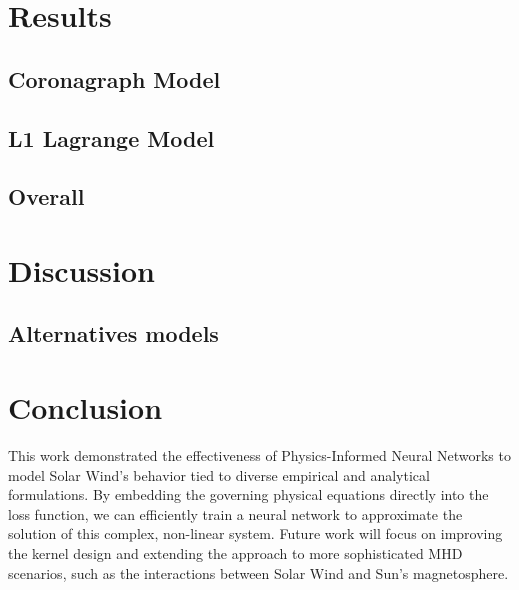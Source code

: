 \documentclass[12pt]{article}
\begin{document}
\section{Results}

\subsection{Coronagraph Model}

\subsection{L1 Lagrange Model}

\subsection{Overall}

\section{Discussion}

\subsection{Alternatives models}

\section{Conclusion}
This work demonstrated the effectiveness of Physics-Informed Neural Networks to model Solar Wind's behavior tied to diverse empirical and analytical formulations. By embedding the governing physical equations directly into the loss function, we can efficiently train a neural network to approximate the solution of this complex, non-linear system. Future work will focus on improving the kernel design and extending the approach to more sophisticated MHD scenarios, such as the interactions between Solar Wind and Sun's magnetosphere.




\end{document}
